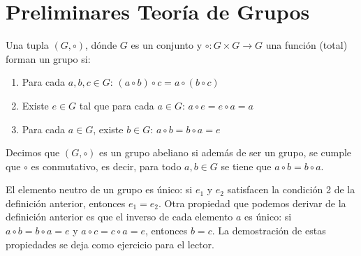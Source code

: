 

\newpage
\section{Preliminares Teoría de Grupos}
\label{app-grupos}


\begin{definition}[Grupo]
Una tupla $(G,\circ)$, dónde $G$ es un conjunto y $\circ :G\times G\to G$ una función (total) forman un grupo si:
\begin{enumerate}
	\item Para cada $a,b,c \in G$: $(a \circ b) \circ c = a \circ (b
\circ c)$

	\item Existe $e \in G$ tal que para cada $a \in G$: $a \circ e = e \circ a = a$

   \item Para cada $a \in G$, existe $b \in G$: $a \circ b 	= b \circ a = e$
\end{enumerate}
Decimos que $(G,\circ)$ es un grupo abeliano si además de ser un grupo, se cumple que $\circ$ es conmutativo, es decir, para todo $a,b\in G$ se tiene que $a\circ b = b\circ a$.
\end{definition}

El elemento neutro de un grupo es único: si $e_1$ y $e_2$ satisfacen
la condición 2 de la definición anterior, entonces $e_1= e_2$.  Otra
propiedad que podemos derivar de la definición anterior es que el
inverso de cada elemento $a$ es único: si $a \circ b = b \circ a= e$ y
$a \circ c = c \circ a = e$, entonces $b = c$. La demostración de
estas propiedades se deja como ejercicio para el lector.


